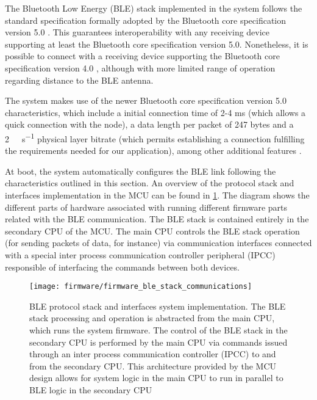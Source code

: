The Bluetooth Low Energy (BLE) stack implemented in the system follows the standard specification formally adopted by the Bluetooth core specification version 5.0 \cite{Bluetooth52}. This guarantees interoperability with any receiving device supporting at least the Bluetooth core specification version 5.0. Nonetheless, it is possible to connect with a receiving device supporting the Bluetooth core specification version 4.0 \cite{Bluetooth40}, although with more limited range of operation regarding distance to the BLE antenna.

The system makes use of the newer Bluetooth core specification version 5.0 \cite{Bluetooth52} characteristics, which include a initial connection time of 2-4 ms (which allows a quick connection with the node), a data length per packet of 247 bytes and a \SI{2}{\mega\bit\per\second} physical layer bitrate (which permits establishing a connection fulfilling the requirements needed for our application), among other additional features \cite{Bluetooth52}.

At boot, the system automatically configures the BLE link following the characteristics outlined in this section. An overview of the protocol stack and interfaces implementation in the MCU can be found in \cref{fig:firmware_ble_stack_communications}. The diagram shows the different parts of hardware associated with running different firmware parts related with the BLE communication. The BLE stack is contained entirely in the secondary CPU of the MCU. The main CPU controls the BLE stack operation (for sending packets of data, for instance) via communication interfaces connected with a special inter process communication controller peripheral (IPCC) responsible of interfacing the commands between both devices. %

\begin{figure}[ht]
	\centering
	\texttt{[image: firmware/firmware\_ble\_stack\_communications]}
	\caption{BLE protocol stack and interfaces system implementation. The BLE stack processing and operation is abstracted from the main CPU, which runs the system firmware. The control of the BLE stack in the secondary CPU is performed by the main CPU via commands issued through an inter process communication controller (IPCC) to and from the secondary CPU. This architecture provided by the MCU design allows for system logic in the main CPU to run in parallel to BLE logic in the secondary CPU}
	\label{fig:firmware_ble_stack_communications}
\end{figure}

